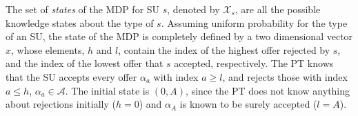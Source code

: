 

The set of \textit{states} of the MDP for SU $s$, denoted by $\mathcal{X}_s$, are all the possible knowledge states about the type of $s$. Assuming uniform probability for the type of an SU, the state of the MDP is completely defined by a two dimensional vector $x$, whose elements, $h$ and $l$, contain the index of the highest offer rejected by $s$, and the index of the lowest offer that $s$ accepted, respectively.
The PT knows that the SU accepts every offer $\alpha_a$ with index $a \geq l$, and rejects those with index $a \leq h$, $\alpha_a \in \mathcal{A}$.
The initial state is $(0,A)$, since the PT does not know anything about rejections initially ($h=0$) and $\alpha_A$ is known to be surely accepted ($l=A$).


